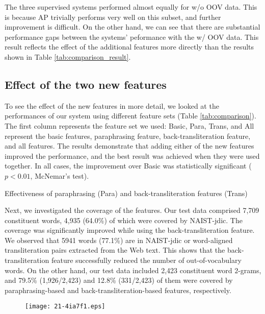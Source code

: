 \documentclass[english]{jnlp_1.4_rep}
\begin{document}
The three supervised systems performed almost equally for w/o OOV
data. This is because {\sc AP} trivially performs very well on this
subset, and further improvement is difficult. On the
other hand, we can see that there are substantial performance gaps
between the systems' peformance with the w/ OOV data. This result
reflects the effect of the additional features more directly than the
results shown in Table \ref{tab:comparison_result}.


\subsection{Effect of the two new features}
\label{sec:effect}

To see the effect of the new features in more detail, we looked at the
performances of our system using different feature sets (Table
\ref{tab:comparison}). The first column represents the feature set we
used: {\sc Basic}, {\sc Para}, {\sc Trans}, and {\sc All} represent the
basic features, paraphrasing feature, back-transliteration feature, and
all features. The results demonstrate that adding
either of the new features improved the performance, and the best result
was achieved when they were used together. In all cases, the improvement
over {\sc Basic} was statistically significant ($p<0.01$, McNemar's
test).

 \begin{table}[b]
    \caption{Effectiveness of paraphrasing ({\sc Para}) and
    back-transliteration features ({\sc Trans})}
   \label{tab:comparison}

\end{table}

Next, we investigated the coverage of the features. Our test data
comprised 7,709 constituent words, 4,935 (64.0\%) of which were covered by
NAIST-jdic. The coverage was significantly improved while using the
back-transliteration feature. We observed that 5941 words (77.1\%) are
in NAIST-jdic or word-aligned transliteration pairs extracted from the
Web text. This shows that the back-transliteration feature successfully
reduced the number of out-of-vocabulary words. On the other hand, our
test data included 2,423 constituent word $2$-grams, and 79.5\%
(1,926/2,423) and 12.8\% (331/2,423) of them were covered by
paraphrasing-based and back-transliteration-based features, respectively.

\begin{figure}[b]
 \begin{center}
\texttt{[image: 21-4ia7f1.eps]}
 \end{center}
  \label{fig:feature-coverage}
\end{figure}
\end{document}
